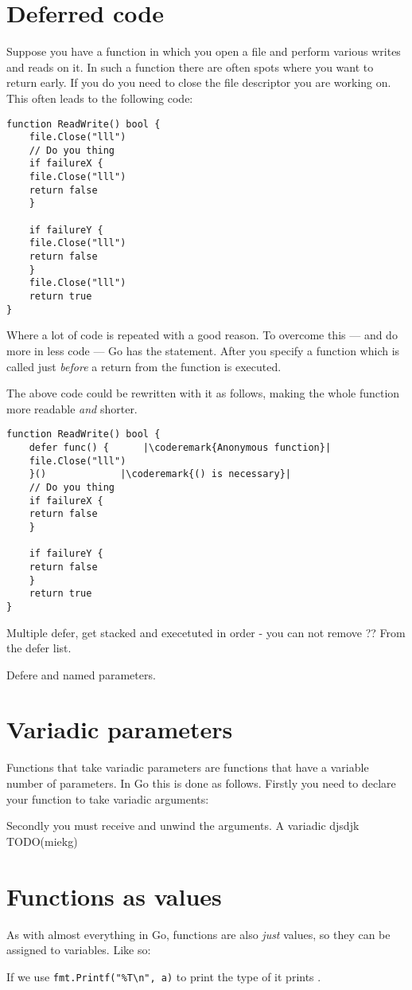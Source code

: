 \section{Deferred code}
Suppose you have a function in which you open a file and perform various
writes and reads on it. In such a function there are often spots where
you want to return early. If you do you need to close the file
descriptor you are working on. This often leads to the following code:
\begin{lstlisting}[caption=Without \func{defer}]
function ReadWrite() bool {
    file.Close("lll")
    // Do you thing
    if failureX {
	file.Close("lll")
	return false
    }

    if failureY {
	file.Close("lll")
	return false
    }
    file.Close("lll")
    return true
}
\end{lstlisting}
Where a lot of code is repeated with a good reason. To overcome this ---
and do more in less code --- Go has the  statement. After
 you specify a function which is called just \emph{before} a
return from the function is executed.

The above code could be rewritten with it as follows, making the whole
function more readable \emph{and} shorter.
\begin{lstlisting}[caption=With \func{defer}]
function ReadWrite() bool {
    defer func() {	    |\coderemark{Anonymous function}|
	file.Close("lll")
    }()			    |\coderemark{() is necessary}|
    // Do you thing
    if failureX {
	return false
    }

    if failureY {
	return false
    }
    return true
}
\end{lstlisting}
Multiple defer, get stacked and execetuted in order - you can not
remove ?? From the defer list.

Defere and named parameters.


\section{Variadic parameters}
Functions that take variadic parameters are functions that have a
variable number of parameters. In Go this is done as follows.
Firstly you need to declare your function to take variadic arguments:

Secondly you must receive and unwind the arguments. A variadic
djsdjk TODO(miekg)

\section{Functions as values}
\label{sec:functions as values}
As with almost everything in Go, functions are also \emph{just} values,
so they can be assigned to variables. Like so:

If we use \lstinline{fmt.Printf("%T\n", a)} to print the type of  it prints
.

